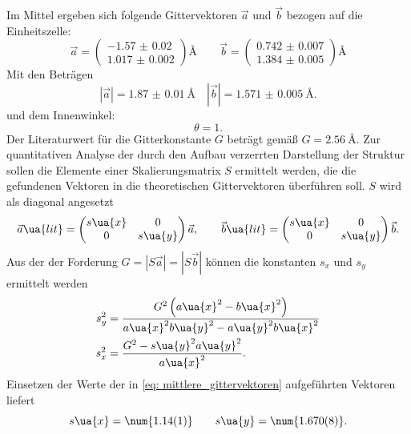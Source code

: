 Im Mittel ergeben sich folgende Gittervektoren $\vec{a}$ und $\vec{b}$ bezogen auf die Einheitszelle:
\begin{equation}
  \vec{a} = \begin{pmatrix} \num{-1.57(2)} \\  \num{1.017(2)} \end{pmatrix}\si{\angstrom} \qquad
  \vec{b} = \begin{pmatrix} \num{0.742(7)} \\  \num{1.384(5)} \end{pmatrix}\si{\angstrom}
\end{equation}
Mit den Beträgen
\begin{equation}
  \left|\vec{a}\right| = \SI{1.87(1)}{\angstrom} \quad \left|\vec{b}\right| = \SI{1.571(5)}{\angstrom}.
  \label{eq: mittlere_gittervektoren}
\end{equation}
und dem Innenwinkel:
\begin{equation}
  \theta = 1.
\end{equation}
Der Literaturwert für die Gitterkonstante $G$ beträgt gemäß \cite{} $G = \SI{2.56}{\angstrom}$. Zur quantitativen Analyse
der durch den Aufbau verzerrten Darstellung der Struktur sollen die Elemente einer Skalierungsmatrix $S$ ermittelt werden, die
die gefundenen Vektoren in die theoretischen Gittervektoren überführen soll. $S$ wird als diagonal angesetzt
\begin{equation}
  \vec{a}\ua{lit} = \begin{pmatrix} s\ua{x} & 0 \\  0  &   s\ua{y} \end{pmatrix} \vec{a},
  \qquad \vec{b}\ua{lit} = \begin{pmatrix} s\ua{x} & 0 \\  0  &   s\ua{y} \end{pmatrix} \vec{b}.
\end{equation}
Aus der der Forderung $G = \left|S \vec{a}\right| = \left|S \vec{b}\right|$ können die konstanten $s_x$ und $s_y$ ermittelt werden
\begin{align}
  s_y^2 &= \frac{G^2\left( a\ua{x}^2 - b\ua{x}^2\right)}{a\ua{x}^2 b\ua{y}^2 - a\ua{y}^2 b\ua{x}^2} \\
  s_x^2 &= \frac{G^2 - s\ua{y}^2 a\ua{y}^2}{a\ua{x}^2}.
\end{align}
Einsetzen der Werte der in \eqref{eq: mittlere_gittervektoren} aufgeführten Vektoren liefert
\begin{equation}
  s\ua{x} = \num{1.14(1)}  \qquad s\ua{y} = \num{1.670(8)}.
\end{equation}
